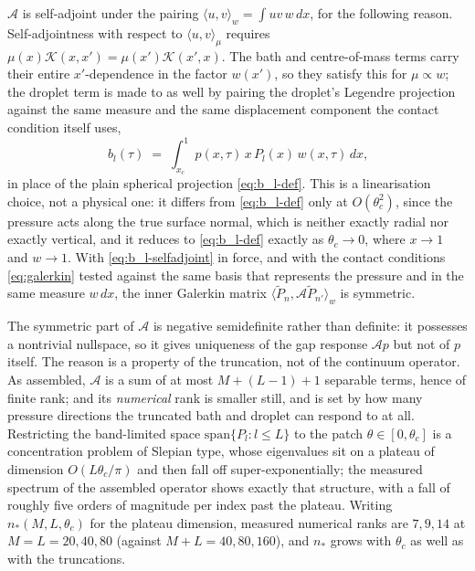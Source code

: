 $\mathcal A$ is self-adjoint under the pairing $\langle u,v\rangle_w=\int uv\,w\,dx$, for the following reason. Self-adjointness with respect to $\langle u,v\rangle_\mu$ requires $\mu(x)\mathcal K(x,x')=\mu(x')\mathcal K(x',x)$. The bath and centre-of-mass terms carry their entire $x'$-dependence in the factor $w(x')$, so they satisfy this for $\mu\propto w$; the droplet term is made to as well by pairing the droplet's Legendre projection against the same measure and the same displacement component the contact condition itself uses,
\begin{equation}
    b_l(\tau) \;=\; \int_{x_c}^1 p(x,\tau)\,x\,P_l(x)\,w(x,\tau)\,dx\text{,}
    \label{eq:b_l-selfadjoint}
\end{equation}
in place of the plain spherical projection \eqref{eq:b_l-def}. This is a linearisation choice, not a physical one: it differs from \eqref{eq:b_l-def} only at $O(\theta_c^2)$, since the pressure acts along the true surface normal, which is neither exactly radial nor exactly vertical, and it reduces to \eqref{eq:b_l-def} exactly as $\theta_c\to0$, where $x\to1$ and $w\to1$. With \eqref{eq:b_l-selfadjoint} in force, and with the contact conditions \eqref{eq:galerkin} tested against the same basis that represents the pressure and in the same measure $w\,dx$, the inner Galerkin matrix $\langle\tilde P_n,\mathcal A\tilde P_{n'}\rangle_w$ is symmetric.

The symmetric part of $\mathcal A$ is negative semidefinite rather than definite: it possesses a nontrivial nullspace, so it gives uniqueness of the gap response $\mathcal A p$ but not of $p$ itself. The reason is a property of the truncation, not of the continuum operator. As assembled, $\mathcal A$ is a sum of at most $M+(L-1)+1$ separable terms, hence of finite rank; and its \emph{numerical} rank is smaller still, and is set by how many pressure directions the truncated bath and droplet can respond to at all. Restricting the band-limited space $\mathrm{span}\{P_l:l\le L\}$ to the patch $\theta\in[0,\theta_c]$ is a concentration problem of Slepian type, whose eigenvalues sit on a plateau of dimension $O(L\theta_c/\pi)$ and then fall off super-exponentially; the measured spectrum of the assembled operator shows exactly that structure, with a fall of roughly five orders of magnitude per index past the plateau. Writing $n_\ast(M,L,\theta_c)$ for the plateau dimension, measured numerical ranks are $7,9,14$ at $M=L=20,40,80$ (against $M+L=40,80,160$), and $n_\ast$ grows with $\theta_c$ as well as with the truncations.

